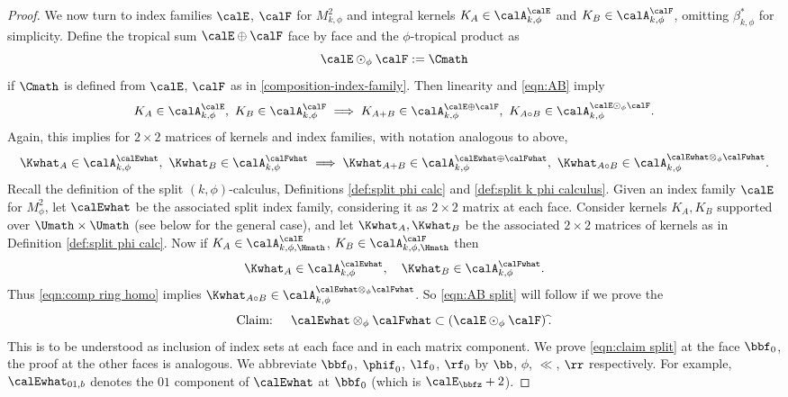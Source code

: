 \begin{proof}
We now turn to index families $\calE$, $\calF$ for $M^2_{k,\phi}$ and integral kernels
$K_A\in\calA^\calE_{k,\phi}$ and $K_B\in\calA^\calF_{k,\phi}$, omitting $\beta_{k,\phi}^*$ for simplicity. Define the tropical sum
$\calE\oplus\calF$ face by face and the $\phi$-tropical product as
\begin{equation}
\label{eqn:def odot phi}
\calE \odot_\phi \calF := \Cmath
\end{equation}
if $\Cmath$ is defined from $\calE$, $\calF$ as in \eqref{composition-index-family}.
Then linearity and \eqref{eqn:AB} imply
\[
K_A\in \calA^\calE_{k,\phi},\ K_B \in \calA^\calF_{k,\phi} \implies
K_{A+B} \in \calA_{k,\phi}^{\calE\oplus\calF},\ K_{A\circ B}\in\calA_{k,\phi}^{\calE\odot_\phi \calF}.
\]
Again, this implies for $2\times2$ matrices of kernels and index families, with notation analogous to above,
\begin{equation}
\label{eqn:comp ring homo}
\Kwhat_A\in \calA_{k,\phi}^\calEwhat,\ \Kwhat_B \in \calA_{k,\phi}^\calFwhat \implies
\Kwhat_{A+B} \in \calA_{k,\phi}^{\calEwhat\oplus\calFwhat},\ \Kwhat_{A\circ B}\in\calA_{k,\phi}^{\calEwhat\otimes_\phi \calFwhat}.
\end{equation}
Recall the definition of the split $(k,\phi)$-calculus, Definitions \ref{def:split phi calc} and \ref{def:split k phi calculus}.
Given an index family $\calE$ for $M^2_\phi$, let $\calEwhat$ be the associated split index family, considering it as $2\times2$ matrix at each face.
Consider kernels $K_A,K_B$ supported over $\Umath\times\Umath$ (see below for the general case), and let $\Kwhat_A,\Kwhat_B$ be the associated $2\times2$ matrices of kernels as in Definition \ref{def:split phi calc}.
Now if $K_A\in \calA^\calE_{k,\phi,\Hmath}$, $K_{B} \in\calA^\calF_{k,\phi,\Hmath}$
then\vspace*{-3pt}
\[
\Kwhat_A\in\calA^\calEwhat_{k,\phi}, \quad \Kwhat_B\in\calA^\calFwhat_{k,\phi}.
\]
Thus \eqref{eqn:comp ring homo} implies $\Kwhat_{A\circ B}\in \calA^{\calEwhat\otimes_\phi \calFwhat}_{k,\phi}$.
So \eqref{eqn:AB split} will follow if we prove the\vspace*{-3pt}
\begin{equation}
\label{eqn:claim split}
\text{Claim: }\quad \calEwhat \otimes_\phi \calFwhat \subset (\calE \odot_\phi\calF)\,\widehat{}.
\end{equation}
This is to be understood as inclusion of index sets at each face and in each matrix component. We prove \eqref{eqn:claim split} at the face $\bbf_0$, the proof at the other faces is analogous. We abbreviate $\bbf_0$, $\phif_0$, $\lf_0$, $\rf_0$ by $\bb$, $\phi$, $\ll$, $\rr$ respectively. For example, $\calEwhat_{01,b}$ denotes the $01$ component of $\calEwhat$ at $\bbf_0$ (which is $\calE_\bbfz+2$).


\end{proof}
